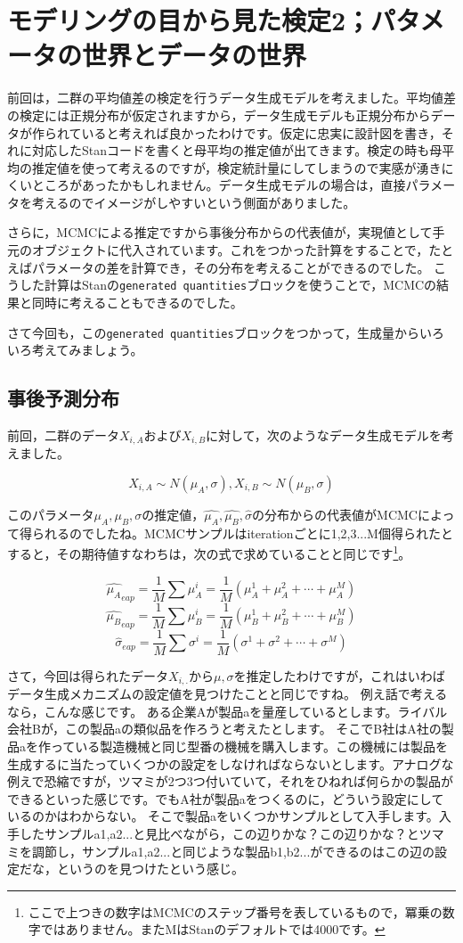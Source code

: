\documentclass{ltjsbook}
\begin{document}
\chapter{モデリングの目から見た検定2；パタメータの世界とデータの世界}
\label{x20_modeling2}
前回は，二群の平均値差の検定を行うデータ生成モデルを考えました。平均値差の検定には正規分布が仮定されますから，データ生成モデルも正規分布からデータが作られていると考えれば良かったわけです。仮定に忠実に設計図を書き，それに対応したStanコードを書くと母平均の推定値が出てきます。検定の時も母平均の推定値を使って考えるのですが，検定統計量にしてしまうので実感が湧きにくいところがあったかもしれません。データ生成モデルの場合は，直接パラメータを考えるのでイメージがしやすいという側面がありました。

さらに，MCMCによる推定ですから事後分布からの代表値が，実現値として手元のオブジェクトに代入されています。これをつかった計算をすることで，たとえばパラメータの差を計算でき，その分布を考えることができるのでした。
こうした計算はStanの\texttt{generated quantities}ブロックを使うことで，MCMCの結果と同時に考えることもできるのでした。

さて今回も，この\texttt{generated quantities}ブロックをつかって，生成量からいろいろ考えてみましょう。
\section{事後予測分布}
前回，二群のデータ$X_{i,A}$および$X_{i,B}$に対して，次のようなデータ生成モデルを考えました。

$$ X_{i,A} \sim N(\mu_A,\sigma), X_{i,B} \sim N(\mu_B,\sigma) $$

このパラメータ$\mu_A,\mu_B,\sigma$の推定値，$\hat{\mu_A},\hat{\mu_B},\hat{\sigma}$の分布からの代表値がMCMCによって得られるのでしたね。MCMCサンプルはiterationごとに1,2,3...M個得られたとすると，その期待値すなわちは，次の式で求めていることと同じです\footnote{ここで上つきの数字はMCMCのステップ番号を表しているもので，冪乗の数字ではありません。またMはStanのデフォルトでは4000です。}。

$$ \hat{\mu_A}_{eap} = \frac{1}{M}\sum \mu_A^i = \frac{1}{M}(\mu_A^1+\mu_A^2+\cdots+\mu_A^M) $$
$$ \hat{\mu_B}_{eap} = \frac{1}{M}\sum \mu_B^i = \frac{1}{M}(\mu_B^1+\mu_B^2+\cdots+\mu_B^M) $$
$$ \hat{\sigma}_{eap} = \frac{1}{M}\sum \sigma^i = \frac{1}{M}(\sigma^1+\sigma^2+\cdots+\sigma^M) $$

さて，今回は得られたデータ$X_{i,.}$から$\mu,\sigma$を推定したわけですが，これはいわばデータ生成メカニズムの設定値を見つけたことと同じですね。
例え話で考えるなら，こんな感じです。
ある企業Aが製品aを量産しているとします。ライバル会社Bが，この製品aの類似品を作ろうと考えたとします。
そこでB社はA社の製品aを作っている製造機械と同じ型番の機械を購入します。この機械には製品を生成するに当たっていくつかの設定をしなければならないとします。アナログな例えで恐縮ですが，ツマミが2つ3つ付いていて，それをひねれば何らかの製品ができるといった感じです。でもA社が製品aをつくるのに，どういう設定にしているのかはわからない。
そこで製品aをいくつかサンプルとして入手します。入手したサンプルa1,a2...と見比べながら，この辺りかな？この辺りかな？とツマミを調節し，サンプルa1,a2...と同じような製品b1,b2...ができるのはこの辺の設定だな，というのを見つけたという感じ。
\end{document}
